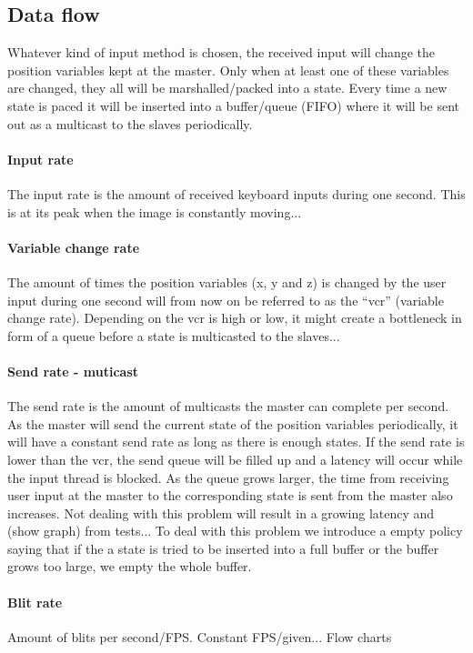 \documentclass[12pt, a4paper, oneside]{article}
\begin{document}
\subsection{Data flow}
Whatever kind of input method is chosen, the received input will change the position variables kept at the master. Only when at least one of these variables are changed, they all will be marshalled/packed into a state. Every time a new state is paced it will be inserted into a buffer/queue (FIFO)  where it will be sent out as a multicast to the slaves periodically.

\paragraph{Input rate}
The input rate is the amount of received keyboard inputs during one second. This is at its peak when the image is constantly moving...
\paragraph{Variable change rate}
The amount of times the position variables (x, y and z) is changed by the user input during one second will from now on be referred to as the “vcr” (variable change rate).
Depending on the vcr is high or low, it might create a bottleneck in form of a queue before a state is multicasted to the slaves... 
\paragraph{Send rate - muticast}
The send rate is the amount of multicasts the master can complete per second. As the master will send the current state of the position variables periodically, it will have a constant send rate as long as there is enough states. If the send rate is lower than the vcr, the send queue will be filled up and a latency will occur while the input thread is blocked. As the queue grows larger, the time from receiving user input at the master to the corresponding state is sent from the master also increases. 
Not dealing with this problem will result in a growing latency and (show graph) from tests... 
To deal with this problem we introduce a empty policy saying that if the a state is tried to be inserted into a full buffer or the buffer grows too large, we empty the whole buffer.
\paragraph{Blit rate}
Amount of blits per second/FPS. Constant FPS/given...
Flow charts
\end{document}
